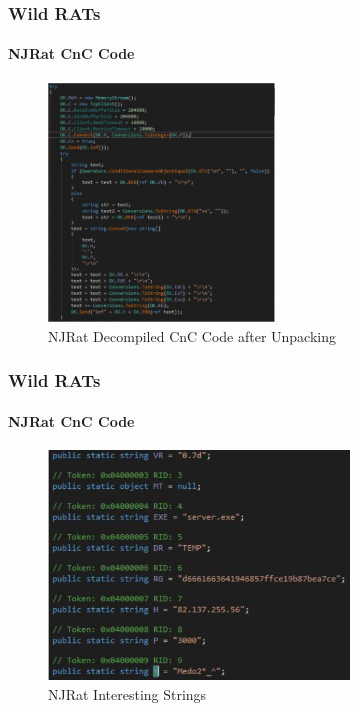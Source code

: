 \documentclass[aspectratio=169]{beamer}
\begin{document}
\begin{frame}
  \frametitle{Wild RATs}
  \framesubtitle{NJRat CnC Code}
  \begin{center}
    \begin{figure}
      \includegraphics[width=6cm,keepaspectratio]{njrat_cnc}
      \caption{NJRat Decompiled CnC Code after Unpacking}
    \end{figure}
  \end{center}
\end{frame}

\begin{frame}
  \frametitle{Wild RATs}
  \framesubtitle{NJRat CnC Code}
  \begin{center}
    \begin{figure}
      \includegraphics[width=8cm,keepaspectratio]{njrat_strings}
      \caption{NJRat Interesting Strings}
    \end{figure}
  \end{center}
\end{frame}
\end{document}
